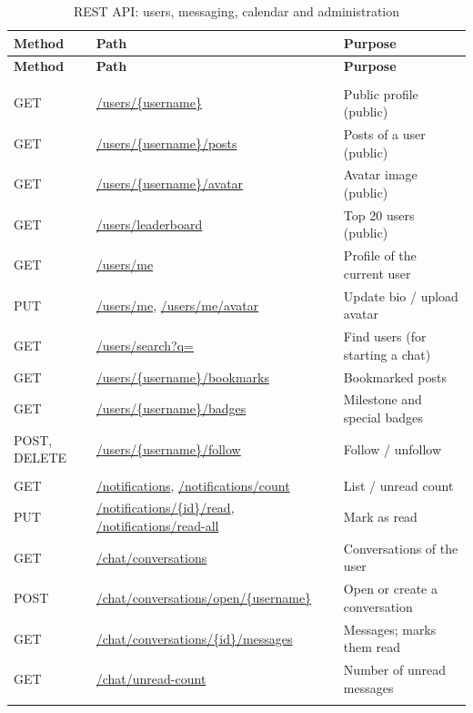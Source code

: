 \begin{longtable}{@{}>{\raggedright\arraybackslash}p{} p{} >{\raggedright\arraybackslash}p{}@{}}
  \toprule
  \textbf{Method} & \textbf{Path} & \textbf{Purpose} \\
  \midrule
  \endfirsthead
  \toprule
  \textbf{Method} & \textbf{Path} & \textbf{Purpose} \\
  \midrule
  \endhead
  \bottomrule
  \endfoot
  \bottomrule
  \caption{REST API: users, messaging, calendar and administration}
  \label{tab:api2}
  \endlastfoot
  \multicolumn{3}{@{}l}{\textit{Users}} \\
  GET & \url{/users/{username}} & Public profile (public) \\
  GET & \url{/users/{username}/posts} & Posts of a user (public) \\
  GET & \url{/users/{username}/avatar} & Avatar image (public) \\
  GET & \url{/users/leaderboard} & Top 20 users (public) \\
  GET & \url{/users/me} & Profile of the current user \\
  PUT & \url{/users/me}, \url{/users/me/avatar} & Update bio / upload avatar \\
  GET & \url{/users/search?q=} & Find users (for starting a chat) \\
  GET & \url{/users/{username}/bookmarks} & Bookmarked posts \\
  GET & \url{/users/{username}/badges} & Milestone and special badges \\
  POST, DELETE & \url{/users/{username}/follow} & Follow / unfollow \\
  \multicolumn{3}{@{}l}{\textit{Notifications and chat}} \\
  GET & \url{/notifications}, \url{/notifications/count} & List / unread count \\
  PUT & \url{/notifications/{id}/read}, \url{/notifications/read-all} & Mark as read \\
  GET & \url{/chat/conversations} & Conversations of the user \\
  POST & \url{/chat/conversations/open/{username}} & Open or create a conversation \\
  GET & \url{/chat/conversations/{id}/messages} & Messages; marks them read \\
  GET & \url{/chat/unread-count} & Number of unread messages \\
  \multicolumn{3}{@{}l}{\textit{Calendar}} \\

\end{longtable}
